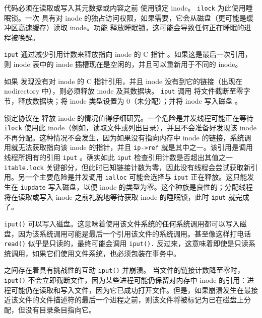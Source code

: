代码必须在读取或写入其元数据或内容之前 使用锁定 inode。
    \lstinline{ilock}   
        为此使用睡眠锁。一次
        具有对 inode 的独占访问权限，如果需要，它会从磁盘（更可能是缓冲区高速缓存）读取 inode。功能
        释放睡眠锁，这可能会导致任何正在睡眠的进程被唤醒。  

   \lstinline{iput}   
        通过减少引用计数来释放指向 inode 的 C 指针
        。如果这是最后一次引用，则 inode 表中的 inode 插槽现在是空闲的，并且可以重新用于不同的 inode。  

如果
        发现没有对 inode 的 C 指针引用，并且 inode 没有到它的链接（出现在 nodirectory 中），则必须释放 inode 及其数据块。
    \lstinline{iput}    调用
        将文件截断至零字节，释放数据块；将 inode 类型设置为 0（未分配）；并将 inode 写入磁盘
        。  

锁定协议在
        释放 inode 的情况值得仔细研究。一个危险是并发线程可能正在等待
    \lstinline{ilock}    使用此 inode（例如，读取文件或列出目录），并且不会准备好发现该 inode 不再分配。这种情况不会发生，因为如果没有指向内存中 inode 的链接，系统调用就无法获取指向该 inode 的指针，并且
    \lstinline{ip->ref}    就是其中之一。该引用是调用线程所拥有的引用
    \lstinline{iput}    。确实如此
    \lstinline{iput}    检查引用计数是否超出其值之一
    \lstinline{itable.lock}    关键部分，但此时已知链接计数为零，因此没有线程会尝试获取新引用。另一个主要危险是并发调用
    \lstinline{ialloc}    可能会选择与
    \lstinline{iput}    正在释放。这只能发生在
    \lstinline{iupdate}    写入磁盘，以便 inode 的类型为零。这个种族是良性的；分配线程将在读取或写入 inode 之前礼貌地等待获取 inode 的睡眠锁，此时
    \lstinline{iput}    就完成了。  

   \lstinline{iput()}    可以写入磁盘。这意味着使用该文件系统的任何系统调用都可以写入磁盘，因为该系统调用可能是最后一个引用该文件的系统调用。甚至像这样打电话
    \lstinline{read()}    似乎是只读的，最终可能会调用
    \lstinline{iput().}    反过来，这意味着即使是只读系统调用，如果它们使用文件系统，也必须包装在事务中。  

之间存在着具有挑战性的互动
    \lstinline{iput()}    并崩溃。
 当文件的链接计数降至零时，   \lstinline{iput()}    不会立即截断文件，因为某些进程可能仍保留对内存中 inode 的引用：进程可能仍在读取和写入文件，因为它已成功打开文件。但是，如果崩溃发生在最接近该文件的文件描述符的最后一个进程之前，则该文件将被标记为已在磁盘上分配，但没有目录条目指向它。  

